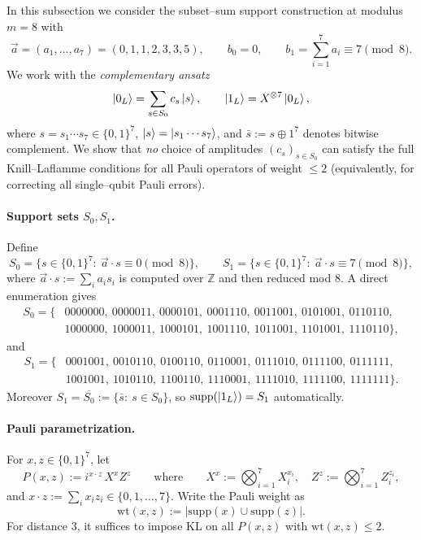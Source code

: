\documentclass[11pt]{article}
\newcommand{\wt}{\mathrm{wt}}
\newcommand{\supp}{\mathrm{supp}}
\begin{document}
In this subsection we consider the subset--sum support construction at modulus $m=8$ with
\[
\vec a=(a_1,\dots,a_7)=(0,1,1,2,3,3,5),\qquad
b_0=0,\qquad
b_1=\sum_{i=1}^7 a_i\equiv 7\pmod 8.
\]
We work with the \emph{complementary ansatz}
\[
\ket{0_L}=\sum_{s\in S_0} c_s \ket{s},\qquad
\ket{1_L}=X^{\otimes 7}\ket{0_L},
\]
where $s=s_1\cdots s_7\in\{0,1\}^7$, $\ket{s}=\ket{s_1\cdots s_7}$, and
$\bar s:=s\oplus 1^7$ denotes bitwise complement.
We show that \emph{no} choice of amplitudes $(c_s)_{s\in S_0}$ can satisfy the full Knill--Laflamme
conditions for all Pauli operators of weight $\le 2$ (equivalently, for correcting all single--qubit Pauli errors).

\paragraph{Support sets $S_0,S_1$.}
Define
\[
S_0=\bigl\{s\in\{0,1\}^7:\ \vec a\cdot s\equiv 0\!\!\pmod 8\bigr\},\qquad
S_1=\bigl\{s\in\{0,1\}^7:\ \vec a\cdot s\equiv 7\!\!\pmod 8\bigr\},
\]
where $\vec a\cdot s:=\sum_i a_i s_i$ is computed over $\mathbb Z$ and then reduced mod $8$.
A direct enumeration gives
\[
\begin{aligned}
S_0=\{&
0000000,\ 0000011,\ 0000101,\ 0001110,\ 0011001,\ 0101001,\ 0110110,\\
&1000000,\ 1000011,\ 1000101,\ 1001110,\ 1011001,\ 1101001,\ 1110110\},
\end{aligned}
\]
and
\[
\begin{aligned}
S_1=\{&
0001001,\ 0010110,\ 0100110,\ 0110001,\ 0111010,\ 0111100,\ 0111111,\\
&1001001,\ 1010110,\ 1100110,\ 1110001,\ 1111010,\ 1111100,\ 1111111\}.
\end{aligned}
\]
Moreover $S_1=\overline{S_0}:=\{\bar s:\ s\in S_0\}$, so $\supp(\ket{1_L})=S_1$ automatically.

\paragraph{Pauli parametrization.}
For $x,z\in\{0,1\}^7$, let
\[
P(x,z):=i^{x\cdot z}\,X^x Z^z
\qquad\text{where}\qquad
X^x:=\bigotimes_{i=1}^7 X_i^{x_i},\quad Z^z:=\bigotimes_{i=1}^7 Z_i^{z_i},
\]
and $x\cdot z:=\sum_i x_i z_i\in\{0,1,\dots,7\}$.
Write the Pauli weight as
\[
\wt(x,z):=\bigl|\supp(x)\cup\supp(z)\bigr|.
\]
For distance $3$, it suffices to impose KL on all $P(x,z)$ with $\wt(x,z)\le 2$.
\end{document}
